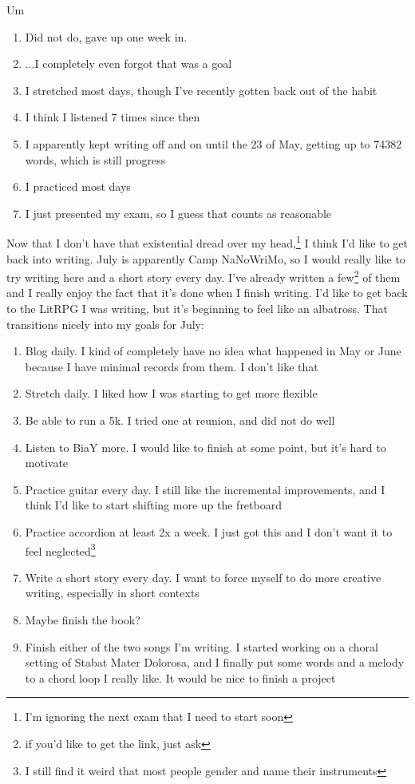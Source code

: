 \documentclass[12pt]{article}[titlepage]
\renewcommand{\,}{\textsuperscript{,}}
\begin{document}
Um
\begin{enumerate}
\item Did not do, gave up one week in.
\item ...I completely even forgot that was a goal
\item I stretched most days, though I've recently gotten back out of the habit
\item I think I listened 7 times since then
\item I apparently kept writing off and on until the 23 of May, getting up to 74382 words, which is still progress
\item I practiced most days
\item I just presented my exam, so I guess that counts as reasonable 
\end{enumerate}

Now that I don't have that existential dread over my head,\footnote{I'm ignoring the next exam that I need to start soon} I think I'd like to get back into writing.
July is apparently Camp NaNoWriMo, so I would really like to try writing here and a short story every day.
I've already written a few\footnote{if you'd like to get the link, just ask} of them and I really enjoy the fact that it's done when I finish writing.
I'd like to get back to the LitRPG I was writing, but it's beginning to feel like an albatross.
That transitions nicely into my goals for July:

\begin{enumerate}
\item Blog daily. I kind of completely have no idea what happened in May or June because I have minimal records from them. I don't like that
\item Stretch daily. I liked how I was starting to get more flexible
\item Be able to run a 5k. I tried one at reunion, and did not do well
\item Listen to BiaY more. I would like to finish at some point, but it's hard to motivate
\item Practice guitar every day. I still like the incremental improvements, and I think I'd like to start shifting more up the fretboard
\item Practice accordion at least 2x a week. I just got this and I don't want it to feel neglected\footnote{I still find it weird that most people gender and name their instruments}
\item Write a short story every day. I want to force myself to do more creative writing, especially in short contexts
\item Maybe finish the book?
\item Finish either of the two songs I'm writing. I started working on a choral setting of Stabat Mater Dolorosa, and I finally put some words and a melody to a chord loop I really like. It would be nice to finish a project
\end{enumerate}
\end{document}
